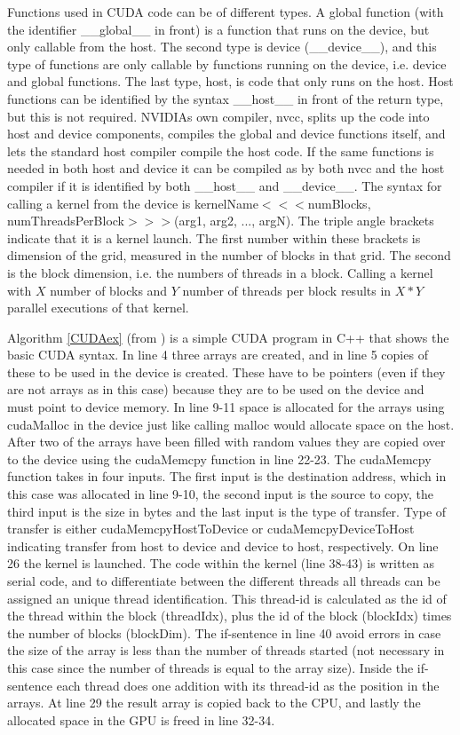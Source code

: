 Functions used in CUDA code can be of different types. A global function (with the identifier \_\_global\_\_ in front) is a function that runs on the device, but only callable from the host. The second type is device (\_\_device\_\_), and this type of functions are only callable by functions running on the device, i.e. device and global functions. The last type, host, is code that only runs on the host. Host functions can be identified by the syntax \_\_host\_\_ in front of the return type, but this is not required. NVIDIAs own compiler, nvcc, splits up the code into host and device components, compiles the global and device functions itself, and lets the standard host compiler compile the host code. If the same functions is needed in both host and device it can be compiled as by both nvcc and the host compiler if it is identified by both \_\_host\_\_ and \_\_device\_\_.  The syntax for calling a kernel from the device is kernelName$<<<$numBlocks, numThreadsPerBlock$>>>$(arg1, arg2, ..., argN). The triple angle brackets indicate that it is a kernel launch. The first number within these brackets is dimension of the grid, measured in the number of blocks in that grid. The second is the block dimension, i.e. the numbers of threads in a block. Calling a kernel with $X$ number of blocks and $Y$ number of threads per block results in $X*Y$ parallel executions of that kernel. 

Algorithm \ref{CUDAex} (from \cite{jason10}) is a simple CUDA program in C++ that shows the basic CUDA syntax. In line 4 three arrays are created, and in line 5 copies of these to be used in the device is created. These have to be pointers (even if they are not arrays as in this case) because they are to be used on the device and must point to device memory. In line 9-11 space is allocated for the arrays using cudaMalloc in the device just like calling malloc would allocate space on the host. After two of the arrays have been filled with random values they are copied over to the device using the cudaMemcpy function in line 22-23. The cudaMemcpy function takes in four inputs. The first input is the destination address, which in this case was allocated in line 9-10, the second input is the source to copy, the third input is the size in bytes and the last input is the type of transfer. Type of transfer is either cudaMemcpyHostToDevice or cudaMemcpyDeviceToHost indicating transfer from host to device and device to host, respectively. On line 26 the kernel is launched. The code within the kernel (line 38-43) is written as serial code, and to differentiate between the different threads all threads can be assigned an unique thread identification. This thread-id is calculated as the id of the thread within the block (threadIdx), plus the id of the block (blockIdx) times the number of blocks (blockDim). The if-sentence in line 40 avoid errors in case the size of the array is less than the number of threads started (not necessary in this case since the number of threads is equal to the array size). Inside the if-sentence each thread does one addition with its thread-id as the position in the arrays.  At line 29 the result array is copied back to the CPU, and lastly the allocated space in the GPU is freed in line 32-34.

